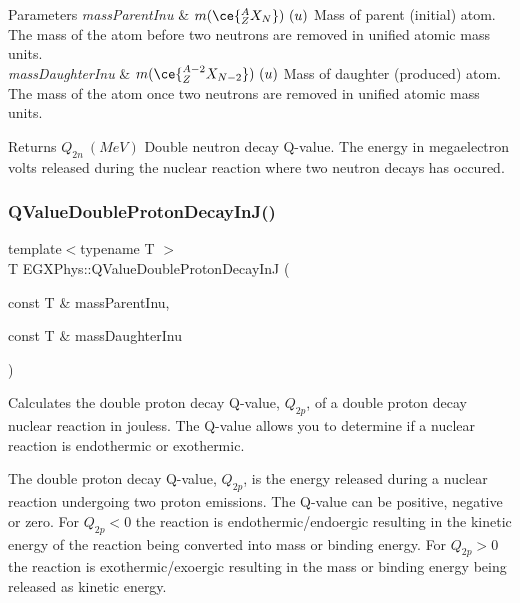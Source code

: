 \begin{DoxyParams}{Parameters}
{\em mass\+Parent\+Inu} & $m(\ce{ ^{A}_{Z}X_{N} })\ (u)$ Mass of parent (initial) atom. The mass of the atom before two neutrons are removed in unified atomic mass units. \\
\hline
{\em mass\+Daughter\+Inu} & $m(\ce{ ^{A-2}_{Z}X_{N-2} })\ (u)$ Mass of daughter (produced) atom. The mass of the atom once two neutrons are removed in unified atomic mass units. \\
\hline
\end{DoxyParams}
\begin{DoxyReturn}{Returns}
$Q_{2n}\ (MeV)$ Double neutron decay Q-\/value. The energy in megaelectron volts released during the nuclear reaction where two neutron decays has occured. 
\end{DoxyReturn}
\mbox{\label{group___e_g_x_phys-_q_value_ga64a3867f65de5586feab99527bb03d31}} 
\subsubsection{\texorpdfstring{Q\+Value\+Double\+Proton\+Decay\+In\+J()}{QValueDoubleProtonDecayInJ()}}
{\footnotesize\ttfamily template$<$typename T $>$ \\
T E\+G\+X\+Phys\+::\+Q\+Value\+Double\+Proton\+Decay\+InJ (\begin{DoxyParamCaption}\item[{const T \&}]{mass\+Parent\+Inu,  }\item[{const T \&}]{mass\+Daughter\+Inu }\end{DoxyParamCaption})}



Calculates the double proton decay Q-\/value, $Q_{2p}$, of a double proton decay nuclear reaction in jouless. The Q-\/value allows you to determine if a nuclear reaction is endothermic or exothermic. 

The double proton decay Q-\/value, $Q_{2p}$, is the energy released during a nuclear reaction undergoing two proton emissions. The Q-\/value can be positive, negative or zero. For $Q_{2p} < 0$ the reaction is endothermic/endoergic resulting in the kinetic energy of the reaction being converted into mass or binding energy. For $Q_{2p} > 0$ the reaction is exothermic/exoergic resulting in the mass or binding energy being released as kinetic energy.


